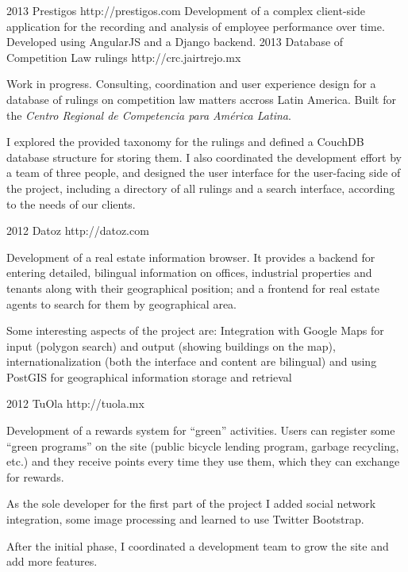 \documentclass[]{friggeri-cv} %
\begin{document}
\begin{entrylist}
\entry
{2013}
{Prestigos}
{http://prestigos.com}
{Development of a complex client-side application for the recording and analysis of employee performance over time. Developed using AngularJS and a Django backend.}
\entry
{2013}
{Database of Competition Law rulings}
{http://crc.jairtrejo.mx}
{Work in progress. Consulting, coordination and user experience design for a database of rulings on competition law matters accross Latin America. Built for the \emph{Centro Regional de Competencia para América Latina}.

I explored the provided taxonomy for the rulings and defined a CouchDB database structure for storing them. I also coordinated the development effort by a team of three people, and designed the user interface for the user-facing side of the project, including a directory of all rulings and a search interface, according to the needs of our clients.}
\entry
{2012}
{Datoz}
{http://datoz.com}
{Development of a real estate information browser. It provides a backend for entering detailed, bilingual information on offices, industrial properties and tenants along with their geographical position; and a frontend for real estate agents to search for them by geographical area.

Some interesting aspects of the project are: Integration with Google Maps for input (polygon search) and output (showing buildings on the map), internationalization (both the interface and content are bilingual) and using PostGIS for geographical information storage and retrieval}
\entry
{2012}
{TuOla}
{http://tuola.mx}
{Development of a rewards system for “green” activities. Users can register some “green programs” on the site (public bicycle lending program, garbage recycling, etc.) and they receive points every time they use them, which they can exchange for rewards.

As the sole developer for the first part of the project I added social network integration, some image processing and learned to use Twitter Bootstrap.

After the initial phase, I coordinated a development team to grow the site and add more features.}
\end{entrylist}
\end{document}
